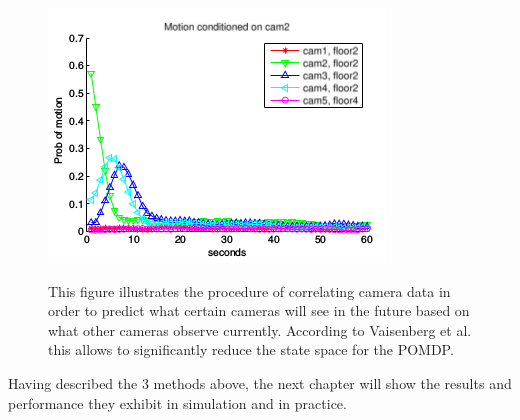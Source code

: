 \documentclass[12pt,twoside]{article}
\theoremstyle{plain}
\theoremstyle{definition}
\theoremstyle{remark}
\begin{document}
\begin{figure}[H]
  \caption{
  This figure illustrates the procedure of correlating camera data in order to predict what certain cameras will see in the future based on what other cameras observe currently. According to Vaisenberg et al. \cite{vaisenberg2014scheduling} this allows to significantly reduce the state space for the POMDP.}
  \centering
    \includegraphics[scale=0.7]{vaisenbergmethod2.png}
  \label{vaisenbergcorrelation}
\end{figure}

Having described the 3 methods above, the next chapter will show the results and performance they exhibit in simulation and in practice.
\end{document}
